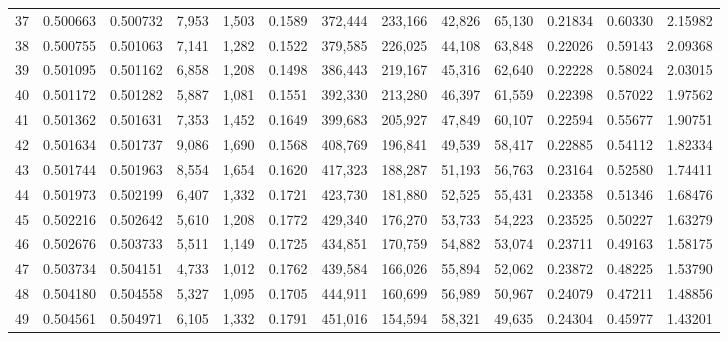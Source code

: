 \begin{tabular}{rrrrrrrrrrrrr}
37 &  0.500663 &  0.500732 &   7,953 &  1,503 &                                     0.1589 &  372,444 &  233,166 &   42,826 &   65,130 &  0.21834 &  0.60330 &  2.15982 \\
38 &  0.500755 &  0.501063 &   7,141 &  1,282 &                                     0.1522 &  379,585 &  226,025 &   44,108 &   63,848 &  0.22026 &  0.59143 &  2.09368 \\
39 &  0.501095 &  0.501162 &   6,858 &  1,208 &                                     0.1498 &  386,443 &  219,167 &   45,316 &   62,640 &  0.22228 &  0.58024 &  2.03015 \\
40 &  0.501172 &  0.501282 &   5,887 &  1,081 &                                     0.1551 &  392,330 &  213,280 &   46,397 &   61,559 &  0.22398 &  0.57022 &  1.97562 \\
41 &  0.501362 &  0.501631 &   7,353 &  1,452 &                                     0.1649 &  399,683 &  205,927 &   47,849 &   60,107 &  0.22594 &  0.55677 &  1.90751 \\
42 &  0.501634 &  0.501737 &   9,086 &  1,690 &                                     0.1568 &  408,769 &  196,841 &   49,539 &   58,417 &  0.22885 &  0.54112 &  1.82334 \\
43 &  0.501744 &  0.501963 &   8,554 &  1,654 &                                     0.1620 &  417,323 &  188,287 &   51,193 &   56,763 &  0.23164 &  0.52580 &  1.74411 \\
44 &  0.501973 &  0.502199 &   6,407 &  1,332 &                                     0.1721 &  423,730 &  181,880 &   52,525 &   55,431 &  0.23358 &  0.51346 &  1.68476 \\
45 &  0.502216 &  0.502642 &   5,610 &  1,208 &                                     0.1772 &  429,340 &  176,270 &   53,733 &   54,223 &  0.23525 &  0.50227 &  1.63279 \\
46 &  0.502676 &  0.503733 &   5,511 &  1,149 &                                     0.1725 &  434,851 &  170,759 &   54,882 &   53,074 &  0.23711 &  0.49163 &  1.58175 \\
47 &  0.503734 &  0.504151 &   4,733 &  1,012 &                                     0.1762 &  439,584 &  166,026 &   55,894 &   52,062 &  0.23872 &  0.48225 &  1.53790 \\
48 &  0.504180 &  0.504558 &   5,327 &  1,095 &                                     0.1705 &  444,911 &  160,699 &   56,989 &   50,967 &  0.24079 &  0.47211 &  1.48856 \\
49 &  0.504561 &  0.504971 &   6,105 &  1,332 &                                     0.1791 &  451,016 &  154,594 &   58,321 &   49,635 &  0.24304 &  0.45977 &  1.43201 \\

\end{tabular}

